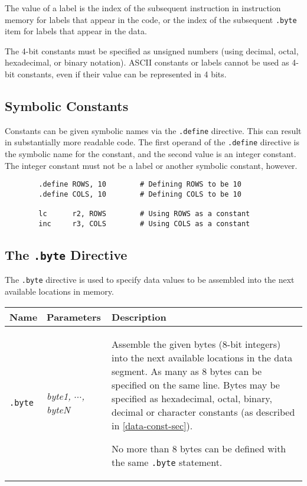 The value of a label is the index of the subsequent instruction in
instruction memory for labels that appear in the code, or the index of
the subsequent {\tt .byte} item for labels that appear in the data.

The 4-bit constants must be specified as unsigned numbers (using
decimal, octal, hexadecimal, or binary notation).  ASCII constants or
labels cannot be used as 4-bit constants, even if their value can be
represented in 4 bits.

\subsection{Symbolic Constants}
\label{data-symconst-sec}

Constants can be given symbolic names via the {\tt .define} directive. 
This can result in substantially more readable code.  The first
operand of the {\tt .define} directive is the symbolic name for the
constant, and the second value is an integer constant.  The integer
constant must not be a label or another symbolic constant, however.

\vspace{3mm}
{\codesize
\begin{verbatim}
        .define ROWS, 10        # Defining ROWS to be 10
        .define COLS, 10        # Defining COLS to be 10

        lc      r2, ROWS        # Using ROWS as a constant
        inc     r3, COLS        # Using COLS as a constant
\end{verbatim}}
\vspace{3mm}

\subsection{The {\tt .byte} Directive}
\label{data-directive-sec}
\label{byte-figure}

The {\tt .byte} directive is used to specify data values to be
assembled into the next available locations in memory.

\vspace{3mm}
\noindent
\begin{tabular}{|ll|p{4.0in}|}
\hline
{\bf Name}      & {\bf Parameters}      & {\bf Description}     \\
\hline
{\tt .byte}     & {\em byte1, $\cdots$, byteN }   &
		Assemble the given bytes (8-bit integers) into the
		next available locations in the data segment.  As many
		as 8 bytes can be specified on the same line.  Bytes
		may be specified as hexadecimal, octal, binary, decimal
		or character constants (as described in
		\ref{data-const-sec}).

		No more than 8 bytes can be defined with the same
		{\tt .byte} statement.
                \\
\hline
\end{tabular}
\vspace{3mm}


